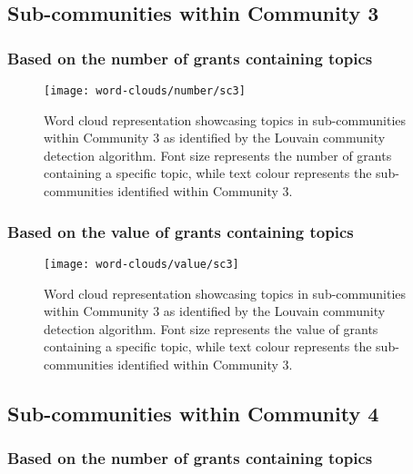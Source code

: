 \subsection{Sub-communities within Community 3}

\subsubsection{Based on the number of grants containing topics}

\begin{figure}[htbp]
    \centering
    \texttt{[image: word-clouds/number/sc3]}
    \caption[Word cloud representation based on the number of grants containing topics in sub-communities within Community 3]{Word cloud representation showcasing topics in sub-communities within Community 3 as identified by the Louvain community detection algorithm. Font size represents the number of grants containing a specific topic, while text colour represents the sub-communities identified within Community 3.}
    \label{fig:topic_grant_number_sc3}
\end{figure}

\subsubsection{Based on the value of grants containing topics}

\begin{figure}[htbp]
    \centering
    \texttt{[image: word-clouds/value/sc3]}
    \caption[Word cloud representation based on the value of grants containing topics in sub-communities within Community 3]{Word cloud representation showcasing topics in sub-communities within Community 3 as identified by the Louvain community detection algorithm. Font size represents the value of grants containing a specific topic, while text colour represents the sub-communities identified within Community 3.}
    \label{fig:topic_grant_value_sc3}
\end{figure}

\subsection{Sub-communities within Community 4}

\subsubsection{Based on the number of grants containing topics}


